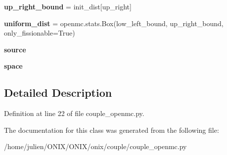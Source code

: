 \begin{DoxyCompactItemize}
\item 
\mbox{\label{classonix_1_1couple_1_1couple__openmc_1_1Couple__openmc_a75de8289a47127eef62b8f2be6c24287}} 
{\bfseries up\+\_\+right\+\_\+bound} = init\+\_\+dist\mbox{[}\textquotesingle{}up\+\_\+right\textquotesingle{}\mbox{]}
\item 
\mbox{\label{classonix_1_1couple_1_1couple__openmc_1_1Couple__openmc_a52df5cdea9adf03dd3a9ba2b21e5cd3a}} 
{\bfseries uniform\+\_\+dist} = openmc.\+stats.\+Box(low\+\_\+left\+\_\+bound, up\+\_\+right\+\_\+bound, only\+\_\+fissionable=True)
\item 
\mbox{\label{classonix_1_1couple_1_1couple__openmc_1_1Couple__openmc_a60550411b7e6a09d07f9608f303e08f7}} 
{\bfseries source}
\item 
\mbox{\label{classonix_1_1couple_1_1couple__openmc_1_1Couple__openmc_a8ca4a5156df1fecfca8d79e0d0aa372c}} 
{\bfseries space}
\end{DoxyCompactItemize}


\subsection{Detailed Description}


Definition at line 22 of file couple\+\_\+openmc.\+py.



The documentation for this class was generated from the following file\+:\begin{DoxyCompactItemize}
\item 
/home/julien/\+O\+N\+I\+X/\+O\+N\+I\+X/onix/couple/couple\+\_\+openmc.\+py\end{DoxyCompactItemize}
